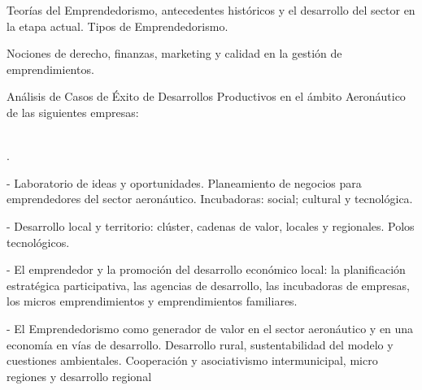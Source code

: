 \vspace{8pt}

\begin{guiones}[leftmargin=18pt,labelsep=12pt,labelindent=-11pt]
  \item Teorías del Emprendedorismo, antecedentes históricos y el desarrollo del sector en la etapa
        actual. Tipos de Emprendedorismo.
  \item Nociones de derecho, finanzas, marketing y calidad en la gestión de emprendimientos.
  \item Análisis de Casos de Éxito de Desarrollos Productivos en el ámbito Aeronáutico de las
        siguientes empresas:
\end{guiones}

\vspace{8pt}
\hspace*{7pt}

\vspace{8pt}
\hspace*{8pt}

\vspace{8pt}
\hspace*{8pt}\\
\hspace*{4pt}.

\vspace{8pt}
- Laboratorio de ideas y oportunidades. Planeamiento de negocios para emprendedores del sector
aeronáutico. Incubadoras: social; cultural y tecnológica.

\vspace{8pt}
- Desarrollo local y territorio: clúster, cadenas de valor, locales y regionales. Polos tecnológicos.

\vspace{8pt}
- El emprendedor y la promoción del desarrollo económico local: la planificación estratégica
participativa, las agencias de desarrollo, las incubadoras de empresas, los micros
emprendimientos y emprendimientos familiares.

\vspace{8pt}
- El Emprendedorismo como generador de valor en el sector aeronáutico y en una economía en
vías de desarrollo. Desarrollo rural, sustentabilidad del modelo y cuestiones ambientales.
Cooperación y asociativismo intermunicipal, micro regiones y desarrollo regional

